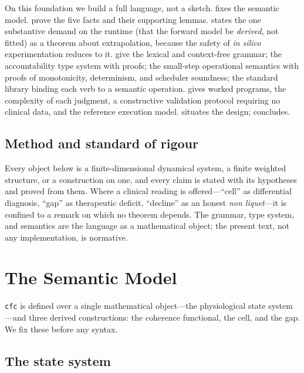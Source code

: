 \documentclass[11pt,a4paper]{article}
\theoremstyle{cfcthm}
\theoremstyle{definition}
\theoremstyle{remark}
\newcommand{\cf}[1]{\texttt{#1}}
\begin{document}
On this foundation we build a full language, not a sketch. 
fixes the semantic model.  prove the five facts and their supporting
lemmas.  states the one substantive demand on the runtime
(that the forward model be \emph{derived}, not fitted) as a theorem about
extrapolation, because the safety of \emph{in silico} experimentation reduces
to it.  give the lexical and context-free
grammar;  the accountability type system with proofs;
 the small-step operational semantics with proofs of
monotonicity, determinism, and scheduler soundness;  the
standard library binding each verb to a semantic operation. 
gives worked programs,  the complexity of each judgment,
 a constructive validation protocol requiring no clinical
data, and  the reference execution model. 
situates the design;  concludes.

\subsection{Method and standard of rigour}

Every object below is a finite-dimensional dynamical system, a finite weighted
structure, or a construction on one, and every claim is stated with its
hypotheses and proved from them. Where a clinical reading is offered---``cell''
as differential diagnosis, ``gap'' as therapeutic deficit, ``decline'' as an
honest \emph{non liquet}---it is confined to a remark on which no theorem
depends. The grammar, type system, and semantics are the language as a
mathematical object; the present text, not any implementation, is normative.

\section{The Semantic Model}
\label{sec:model}

\cf{cfc} is defined over a single mathematical object---the physiological
state system---and three derived constructions: the coherence functional, the
cell, and the gap. We fix these before any syntax.

\subsection{The state system}
\end{document}
